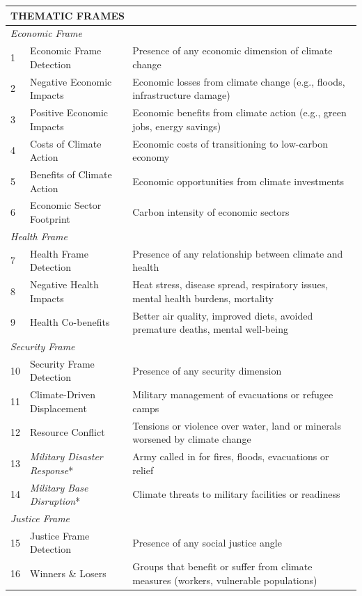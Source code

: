 {\begin{longtable}{p{0.5cm}p{5cm}p{16cm}}
\multicolumn{3}{l}{\cellcolor{gray!10}\textbf{THEMATIC FRAMES}} \\
\midrule
\multicolumn{3}{l}{\textit{Economic Frame}} \\
1 & Economic Frame Detection & Presence of any economic dimension of climate change \\
2 & Negative Economic Impacts & Economic losses from climate change (e.g., floods, infrastructure damage) \\
3 & Positive Economic Impacts & Economic benefits from climate action (e.g., green jobs, energy savings) \\
4 & Costs of Climate Action & Economic costs of transitioning to low-carbon economy \\
5 & Benefits of Climate Action & Economic opportunities from climate investments \\
6 & Economic Sector Footprint & Carbon intensity of economic sectors \\
\midrule
\multicolumn{3}{l}{\textit{Health Frame}} \\
7 & Health Frame Detection & Presence of any relationship between climate and health \\
8 & Negative Health Impacts & Heat stress, disease spread, respiratory issues, mental health burdens, mortality \\
9 & Health Co-benefits & Better air quality, improved diets, avoided premature deaths, mental well-being \\
\midrule
\multicolumn{3}{l}{\textit{Security Frame}} \\
10 & Security Frame Detection & Presence of any security dimension \\
11 & Climate-Driven Displacement & Military management of evacuations or refugee camps \\
12 & Resource Conflict & Tensions or violence over water, land or minerals worsened by climate change \\
13 & \textit{Military Disaster Response}* & Army called in for fires, floods, evacuations or relief \\
14 & \textit{Military Base Disruption}* & Climate threats to military facilities or readiness \\
\midrule
\multicolumn{3}{l}{\textit{Justice Frame}} \\
15 & Justice Frame Detection & Presence of any social justice angle \\
16 & Winners \& Losers & Groups that benefit or suffer from climate measures (workers, vulnerable populations) \\

\end{longtable}}

